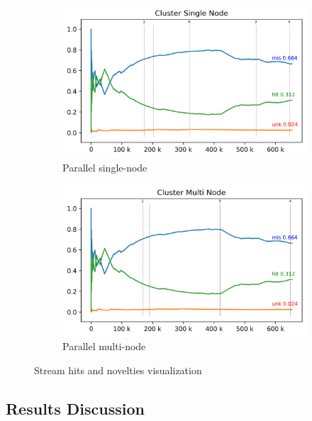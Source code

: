 \begin{figure}[hbt]
{\begin{subfigure}{.5\textwidth}
      \includegraphics[width=\linewidth]{experiments/tmi-base.log.png}
      \caption{Parallel single-node}
      \label{fig:cluster-sub-single}
    \end{subfigure}
    \begin{subfigure}{.5\textwidth}
      \centering
      \includegraphics[width=\linewidth]{experiments/tmi-n12.log.png}
      \caption{Parallel multi-node}
      \label{fig:cluster-sub-multi}
    \end{subfigure}
  }
  \caption{Stream hits and novelties visualization}
  \label{fig:visualization}
\end{figure}


\subsection{Results Discussion}

